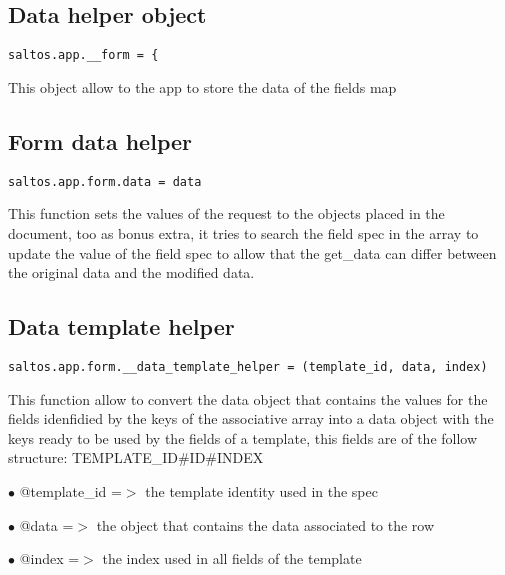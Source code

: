 \documentclass[a4paper]{book}
\begin{document}
\hypertarget{toc376}{}
\subsection{Data helper object}

\begin{lstlisting}
saltos.app.__form = {
\end{lstlisting}

This object allow to the app to store the data of the fields map

\hypertarget{toc377}{}
\subsection{Form data helper}

\begin{lstlisting}
saltos.app.form.data = data
\end{lstlisting}

This function sets the values of the request to the objects placed in the document, too as bonus
extra, it tries to search the field spec in the array to update the value of the field spec to
allow that the get\_data can differ between the original data and the modified data.

\hypertarget{toc378}{}
\subsection{Data template helper}

\begin{lstlisting}
saltos.app.form.__data_template_helper = (template_id, data, index)
\end{lstlisting}

This function allow to convert the data object that contains the values for the fields idenfidied
by the keys of the associative array into a data object with the keys ready to be used by the
fields of a template, this fields are of the follow structure: TEMPLATE\_ID\#ID\#INDEX

\begin{compactitem}
\item[\color{myblue}$\bullet$] @template\_id =$>$ the template identity used in the spec
\item[\color{myblue}$\bullet$] @data        =$>$ the object that contains the data associated to the row
\item[\color{myblue}$\bullet$] @index       =$>$ the index used in all fields of the template
\end{compactitem}
\end{document}
